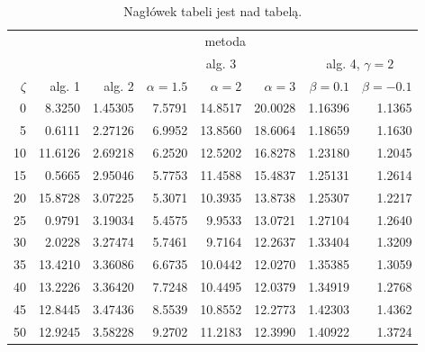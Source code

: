 \documentclass[a4paper,twoside,12pt]{book}
\begin{document}
\begin{table}
	\centering
	\caption{Nagłówek tabeli jest nad tabelą.}
	\label{id:tab:wyniki}
	\begin{tabular}{rrrrrrrr}
		\toprule
		        & \multicolumn{7}{c}{metoda}                                                                                                                                  \\
		\cmidrule{2-8}
		        &                            &         & \multicolumn{3}{c}{alg. 3} & \multicolumn{2}{c}{alg. 4, $\gamma = 2$}                                                \\
		\cmidrule(r){4-6}\cmidrule(r){7-8}
		$\zeta$ & alg. 1                     & alg. 2  & $\alpha= 1.5$              & $\alpha= 2$                              & $\alpha= 3$ & $\beta = 0.1$ & $\beta = -0.1$ \\
		\midrule
		0       & 8.3250                     & 1.45305 & 7.5791                     & 14.8517                                  & 20.0028     & 1.16396       & 1.1365         \\
		5       & 0.6111                     & 2.27126 & 6.9952                     & 13.8560                                  & 18.6064     & 1.18659       & 1.1630         \\
		10      & 11.6126                    & 2.69218 & 6.2520                     & 12.5202                                  & 16.8278     & 1.23180       & 1.2045         \\
		15      & 0.5665                     & 2.95046 & 5.7753                     & 11.4588                                  & 15.4837     & 1.25131       & 1.2614         \\
		20      & 15.8728                    & 3.07225 & 5.3071                     & 10.3935                                  & 13.8738     & 1.25307       & 1.2217         \\
		25      & 0.9791                     & 3.19034 & 5.4575                     & 9.9533                                   & 13.0721     & 1.27104       & 1.2640         \\
		30      & 2.0228                     & 3.27474 & 5.7461                     & 9.7164                                   & 12.2637     & 1.33404       & 1.3209         \\
		35      & 13.4210                    & 3.36086 & 6.6735                     & 10.0442                                  & 12.0270     & 1.35385       & 1.3059         \\
		40      & 13.2226                    & 3.36420 & 7.7248                     & 10.4495                                  & 12.0379     & 1.34919       & 1.2768         \\
		45      & 12.8445                    & 3.47436 & 8.5539                     & 10.8552                                  & 12.2773     & 1.42303       & 1.4362         \\
		50      & 12.9245                    & 3.58228 & 9.2702                     & 11.2183                                  & 12.3990     & 1.40922       & 1.3724         \\
		\bottomrule
	\end{tabular}
\end{table}
\end{document}
